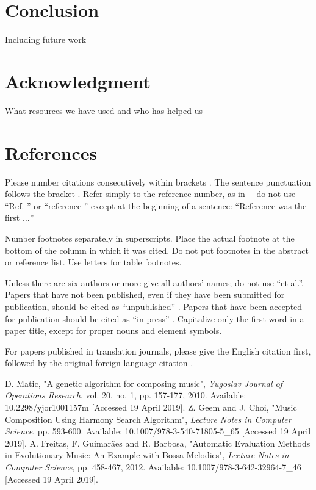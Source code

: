 \documentclass[conference]{IEEEtran}
\begin{document}
\section{Conclusion}
Including future work

\section*{Acknowledgment}
What resources we have used and who has helped us

\section*{References}

Please number citations consecutively within brackets \cite{b1}. The 
sentence punctuation follows the bracket \cite{b2}. Refer simply to the reference 
number, as in \cite{b3}---do not use ``Ref. \cite{b3}'' or ``reference \cite{b3}'' except at 
the beginning of a sentence: ``Reference \cite{b3} was the first $\ldots$''

Number footnotes separately in superscripts. Place the actual footnote at 
the bottom of the column in which it was cited. Do not put footnotes in the 
abstract or reference list. Use letters for table footnotes.

Unless there are six authors or more give all authors' names; do not use 
``et al.''. Papers that have not been published, even if they have been 
submitted for publication, should be cited as ``unpublished'' . Papers 
that have been accepted for publication should be cited as ``in press'' . 
Capitalize only the first word in a paper title, except for proper nouns and 
element symbols.

For papers published in translation journals, please give the English 
citation first, followed by the original foreign-language citation .

\begin{thebibliography}{00}
 D. Matic, "A genetic algorithm for composing music", \textit{Yugoslav Journal of Operations Research}, vol. 20, no. 1, pp. 157-177, 2010. Available: 10.2298/yjor1001157m [Accessed 19 April 2019].
 Z. Geem and J. Choi, "Music Composition Using Harmony Search Algorithm", \textit{Lecture Notes in Computer Science}, pp. 593-600. Available: 10.1007/978-3-540-71805-5\_65 [Accessed 19 April 2019].
 A. Freitas, F. Guimarães and R. Barbosa, "Automatic Evaluation Methods in Evolutionary Music: An Example with Bossa Melodies", \textit{Lecture Notes in Computer Science}, pp. 458-467, 2012. Available: 10.1007/978-3-642-32964-7\_46 [Accessed 19 April 2019].
\end{thebibliography}
\end{document}
